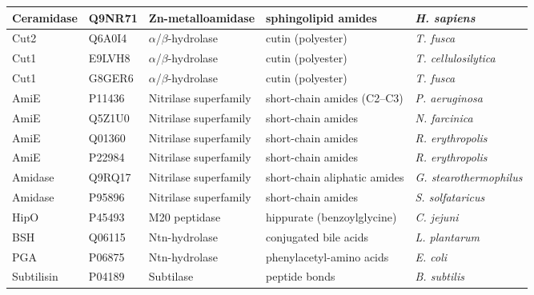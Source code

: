 \documentclass[12pt]{article}
\begin{document}
\begin{table}[H]
\begin{adjustbox}{max width=\textwidth}
\begin{tabular}{lllll}
Ceramidase & Q9NR71 & Zn-metalloamidase & sphingolipid amides & \textit{H. sapiens} \\
\midrule
Cut2 & Q6A0I4 & $\alpha$/$\beta$-hydrolase & cutin (polyester) & \textit{T. fusca} \\
Cut1 & E9LVH8 & $\alpha$/$\beta$-hydrolase & cutin (polyester) & \textit{T. cellulosilytica} \\
Cut1 & G8GER6 & $\alpha$/$\beta$-hydrolase & cutin (polyester) & \textit{T. fusca} \\
\midrule
AmiE & P11436 & Nitrilase superfamily & short-chain amides (C2--C3) & \textit{P. aeruginosa} \\
AmiE & Q5Z1U0 & Nitrilase superfamily & short-chain amides & \textit{N. farcinica} \\
AmiE & Q01360 & Nitrilase superfamily & short-chain amides & \textit{R. erythropolis} \\
AmiE & P22984 & Nitrilase superfamily & short-chain amides & \textit{R. erythropolis} \\
Amidase & Q9RQ17 & Nitrilase superfamily & short-chain aliphatic amides & \textit{G. stearothermophilus} \\
Amidase & P95896 & Nitrilase superfamily & short-chain amides & \textit{S. solfataricus} \\
\midrule
HipO & P45493 & M20 peptidase & hippurate (benzoylglycine) & \textit{C. jejuni} \\
BSH & Q06115 & Ntn-hydrolase & conjugated bile acids & \textit{L. plantarum} \\
PGA & P06875 & Ntn-hydrolase & phenylacetyl-amino acids & \textit{E. coli} \\
Subtilisin & P04189 & Subtilase & peptide bonds & \textit{B. subtilis} \\
\bottomrule
\end{tabular}
\end{adjustbox}
\end{table}
\end{document}
